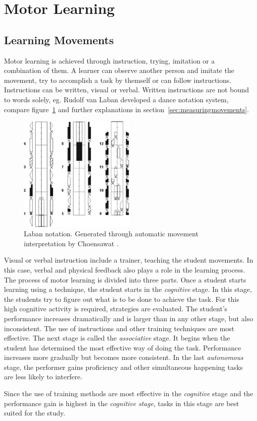 \section{Motor Learning}
\subsection{Learning Movements}
Motor learning is achieved through instruction, trying, imitation or a combination of them. A learner can observe another person and imitate the movement, try to accomplish a task by themself or can follow instructions. Instructions can be written, visual or verbal. Written instructions are not bound to words solely, eg. Rudolf van Laban developed a dance notation system, compare figure~\ref{fig:laban} and further explanations in section~\ref{sec:measuringmovements}.
\begin{figure}
	\centering
	\includegraphics[width=0.5\textwidth]{img/laban.png}
	\caption{Laban notation. Generated through automatic movement interpretation by Choensawat \cite{Choensawat2015}.}
	\label{fig:laban}
\end{figure}
Visual or verbal instruction include a trainer, teaching the student movements. In this case, verbal and physical feedback also plays a role in the learning process. The process of motor learning is divided into three parts. Once a student starts learning using a technique, the student starts in the \textit{cognitive} stage. In this stage, the students try to figure out what is to be done to achieve the task. For this high cognitive activity is required, strategies are evaluated. The student's performance increases dramatically and is larger than in any other stage, but also inconsistent. The use of instructions and other training techniques are most effective. The next stage is called the \textit{associative} stage. It begins when the student has determined the most effective way of doing the task. Performance increases more gradually but becomes more consistent. In the last \textit{autonomous} stage, the performer gains proficiency and other simultaneous happening tasks are less likely to interfere. 
\begin{tcolorbox}[colback=red!30!white]
Since the use of training methods are most effective in the \textit{cognitive} stage and the performance gain is highest in the \textit{cognitive stage}, tasks in this stage are best suited for the study.
\end{tcolorbox}

